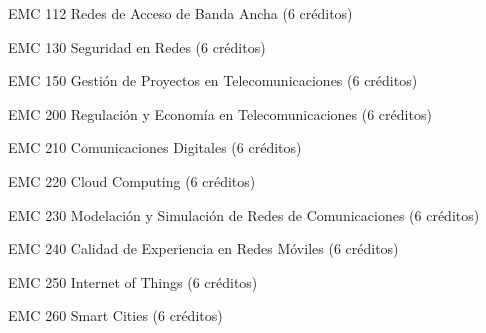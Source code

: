 EMC 112 Redes de Acceso de Banda Ancha (6 créditos)

EMC 130 Seguridad en Redes (6 créditos)

EMC 150 Gestión de Proyectos en Telecomunicaciones (6 créditos)

EMC 200 Regulación y Economía en Telecomunicaciones (6 créditos)

EMC 210 Comunicaciones Digitales (6 créditos)

EMC 220 Cloud Computing (6 créditos)

EMC 230 Modelación y Simulación de Redes de Comunicaciones (6 créditos)

EMC 240 Calidad de Experiencia en Redes Móviles (6 créditos)

EMC 250 Internet of Things (6 créditos)

EMC 260 Smart Cities (6 créditos)